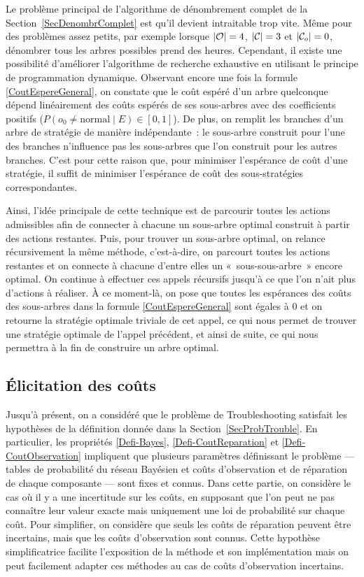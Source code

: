 \documentclass[a4paper,11pt]{article}
\theoremstyle{plain}
\theoremstyle{definition}
\DeclarePairedDelimiter{\abs}{\lvert}{\rvert}
\begin{document}
Le problème principal de l'algorithme de dénombrement complet de la Section~\ref{SecDenombrComplet} est qu'il devient intraitable trop vite. Même pour des problèmes assez petits, par exemple lorsque $\abs{\mathcal O} = 4$, $\abs{\mathcal C} = 3$ et $\abs{\mathcal C_o} = 0$, dénombrer tous les arbres possibles prend des heures. Cependant, il existe une possibilité d'améliorer l'algorithme de recherche exhaustive en utilisant le principe de programmation dynamique. Observant encore une fois la formule \eqref{CoutEspereGeneral}, on constate que le coût espéré d'un arbre quelconque dépend linéairement des coûts espérés de ses sous-arbres avec des coefficients positifs ($P(o_0 \neq \text{normal} \mid E) \in \left[0, 1\right]$). De plus, on remplit les branches d'un arbre de stratégie de manière indépendante~: le sous-arbre construit pour l'une des branches n'influence pas les sous-arbres que l'on construit pour les autres branches. C'est pour cette raison que, pour minimiser l'espérance de coût d'une stratégie, il suffit de minimiser l'espérance de coût des sous-stratégies correspondantes.

Ainsi, l'idée principale de cette technique est de parcourir toutes les actions admissibles afin de connecter à chacune un sous-arbre optimal construit à partir des actions restantes. Puis, pour trouver un sous-arbre optimal, on relance récursivement la même méthode, c'est-à-dire, on parcourt toutes les actions restantes et on connecte à chacune d'entre elles un «~sous-sous-arbre~» encore optimal. On continue à effectuer ces appels récursifs jusqu'à ce que l'on n'ait plus d'actions à réaliser. À ce moment-là, on pose que toutes les espérances des coûts des sous-arbres dans la formule \eqref{CoutEspereGeneral} sont égales à $0$ et on retourne la stratégie optimale triviale de cet appel, ce qui nous permet de trouver une stratégie optimale de l'appel précédent, et ainsi de suite, ce qui nous permettra à la fin de construire un arbre optimal.

\subsection{Élicitation des coûts}
\label{SecContribElicitation}

Jusqu'à présent, on a considéré que le problème de Troubleshooting satisfait les hypothèses de la définition donnée dans la Section~\ref{SecProbTrouble}. En particulier, les propriétés \ref{Defi-Bayes}, \ref{Defi-CoutReparation} et \ref{Defi-CoutObservation} impliquent que plusieurs paramètres définissant le problème --- tables de probabilité du réseau Bayésien et coûts d'observation et de réparation de chaque composante --- sont fixes et connus. Dans cette partie, on considère le cas où il y a une incertitude sur les coûts, en supposant que l'on peut ne pas connaître leur valeur exacte mais uniquement une loi de probabilité sur chaque coût. Pour simplifier, on considère que seuls les coûts de réparation peuvent être incertains, mais que les coûts d'observation sont connus. Cette hypothèse simplificatrice facilite l'exposition de la méthode et son implémentation mais on peut facilement adapter ces méthodes au cas de coûts d'observation incertains.
\end{document}

